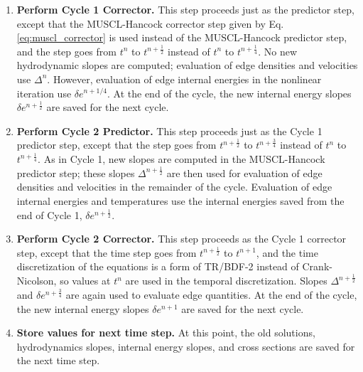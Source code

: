 \documentclass[preprint,12pt]{elsarticle}
\newcommand{\half}{\frac{1}{2}}
\newcommand{\fourth}{\frac{1}{4}}
\begin{document}
\begin{enumerate}
\begin{enumerate}
\begin{enumerate}
\end{enumerate}
\end{enumerate}


\item \textbf{Perform Cycle 1 Corrector.} This step proceeds
just as the predictor step, except that the MUSCL-Hancock
corrector step given by Eq. \eqref{eq:muscl_corrector} is used instead of the MUSCL-Hancock predictor
step, and the step goes from $t^n$ to $t^{n+\half}$ instead
of $t^n$ to $t^{n+\fourth}$. No new hydrodynamic slopes are computed;
evaluation of edge densities and velocities use
$\Delta^n$.  However, evaluation of edge internal energies
in the nonlinear iteration use $\delta e^{n+1/4}$. At the end
of the cycle, the new internal energy slopes $\delta e^{n+\half}$
are saved for the next cycle.


\item \textbf{Perform Cycle 2 Predictor.} This step proceeds
just as the Cycle 1 predictor step, except that the
step goes from $t^{n+\half}$ to $t^{n+\frac{3}{4}}$ instead
of $t^n$ to $t^{n+\fourth}$. As in Cycle 1, new slopes
are computed in the MUSCL-Hancock predictor step;
these slopes $\Delta^{n+\half}$ are then used for
evaluation of edge densities and velocities in the remainder
of the cycle. Evaluation of edge internal energies
and temperatures use the internal energies saved
from the end of Cycle 1, $\delta e^{n+\half}$.


\item \textbf{Perform Cycle 2 Corrector.} This step proceeds
as the Cycle 1 corrector step, except that the time step goes
from $t^{n+\half}$ to $t^{n+1}$, and the time discretization
of the equations is a form of TR/BDF-2
instead of Crank-Nicolson, so values at $t^n$
are used in the temporal discretization. Slopes
$\Delta^{n+\half}$ and $\delta e^{n+\frac{3}{4}}$  are again
used to evaluate edge quantities. At the end
of the cycle, the new internal energy slopes $\delta e^{n+1}$
are saved for the next cycle.


\item \textbf{Store values for next time step.}
At this point, the old solutions, hydrodynamics slopes,
internal energy slopes, and cross sections
are saved for the next time step.

\end{enumerate}
\end{document}
